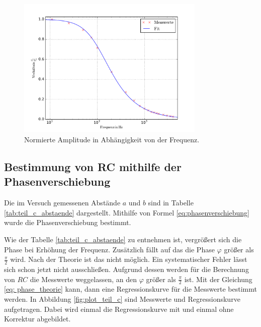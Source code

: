 \begin{figure}
  \centering
  \includegraphics[width=0.8\textwidth]{pics/u_cdurchu_g.pdf}
  \caption{Normierte Amplitude in Abhängigkeit von der Frequenz.}
  \label{fig:teilb}
\end{figure}

\subsection{Bestimmung von RC mithilfe der Phasenverschiebung}
Die im Versuch gemessenen Abstände $a$ und $b$ sind in Tabelle \ref{tab:teil_c_abstaende}
dargestellt. Mithilfe von Formel \eqref{eq:phasenverschiebung} wurde die %
Phasenverschiebung bestimmt.



Wie der Tabelle \ref{tab:teil_c_abstaende} zu entnehmen ist, vergrößert sich die Phase
bei Erhöhung der Frequenz.
Zusätzlich fällt auf das die Phase $\varphi$ größer als $\frac{\pi}{2}$ wird. %
Nach der Theorie ist das nicht möglich.
Ein systematischer Fehler lässt sich schon jetzt nicht ausschließen.
Aufgrund dessen werden für die Berechnung von $RC$ die Messwerte weggelassen, an den %
$\varphi$ größer als $\frac{\pi}{2}$ ist.
Mit der Gleichung \eqref{eq: phase_theorie} kann, dann eine Regressionskurve für die %
Messwerte bestimmt werden.
In Abbildung \ref{fig:plot_teil_c} sind Messwerte und Regressionskurve aufgetragen.
Dabei wird einmal die Regressionskurve mit und einmal ohne Korrektur abgebildet.

